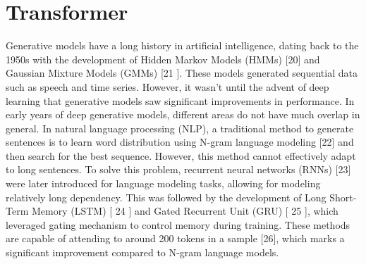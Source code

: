 \documentclass[conference]{IEEEtran}
\begin{document}
\section{Transformer}
\par Generative models have a long history in artificial intelligence, dating back to the 1950s with the
development of Hidden Markov Models (HMMs) [20] and Gaussian Mixture Models (GMMs) [21 ].
These models generated sequential data such as speech and time series. However, it wasn’t until
the advent of deep learning that generative models saw significant improvements in performance.
In early years of deep generative models, different areas do not have much overlap in general.
In natural language processing (NLP), a traditional method to generate sentences is to learn
word distribution using N-gram language modeling [22] and then search for the best sequence.
However, this method cannot effectively adapt to long sentences. To solve this problem, recurrent
neural networks (RNNs) [23] were later introduced for language modeling tasks, allowing for
modeling relatively long dependency. This was followed by the development of Long Short-Term
Memory (LSTM) [ 24 ] and Gated Recurrent Unit (GRU) [ 25 ], which leveraged gating mechanism to
control memory during training. These methods are capable of attending to around 200 tokens in a
sample [26], which marks a significant improvement compared to N-gram language models.
\end{document}
